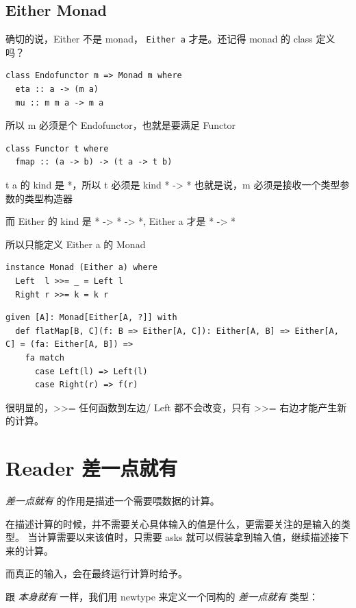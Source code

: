 \documentclass[letterspacing]{tufte-book}
\begin{document}
\section{Either Monad}
\label{sec:org6b6ad30}
确切的说，Either 不是 monad， \texttt{Either a} 才是。还记得 monad 的 class 定义吗？
\lstset{language=haskell,label= ,caption= ,captionpos=b,numbers=none}
\begin{lstlisting}
class Endofunctor m => Monad m where
  eta :: a -> (m a)
  mu :: m m a -> m a
\end{lstlisting}
所以 m 必须是个 Endofunctor，也就是要满足 Functor
\lstset{language=haskell,label= ,caption= ,captionpos=b,numbers=none}
\begin{lstlisting}
class Functor t where
  fmap :: (a -> b) -> (t a -> t b)
\end{lstlisting}
t a 的 kind 是 *，所以 t 必须是 kind * -> *
也就是说，m 必须是接收一个类型参数的类型构造器

而 Either 的 kind 是 * -> * -> *, Either a 才是 * -> *

所以只能定义 Either a 的 Monad
\lstset{language=haskell,label= ,caption= ,captionpos=b,numbers=none}
\begin{lstlisting}
instance Monad (Either a) where
  Left  l >>= _ = Left l
  Right r >>= k = k r
\end{lstlisting}

\lstset{language=scala,label= ,caption= ,captionpos=b,numbers=none}
\begin{lstlisting}
given [A]: Monad[Either[A, ?]] with
  def flatMap[B, C](f: B => Either[A, C]): Either[A, B] => Either[A, C] = (fa: Either[A, B]) =>
    fa match
      case Left(l) => Left(l)
      case Right(r) => f(r)
\end{lstlisting}

很明显的，>>= 任何函数到左边/ Left 都不会改变，只有 >>= 右边才能产生新的计算。

\chapter{Reader 差一点就有}
\label{sec:orge52651d}

\emph{差一点就有} 的作用是描述一个需要喂数据的计算。

在描述计算的时候，并不需要关心具体输入的值是什么，更需要关注的是输入的类型。
当计算需要以来该值时，只需要 asks 就可以假装拿到输入值，继续描述接下来的计算。

而真正的输入，会在最终运行计算时给予。

跟 \emph{本身就有} 一样，我们用 newtype 来定义一个同构的 \emph{差一点就有} 类型：
\end{document}
